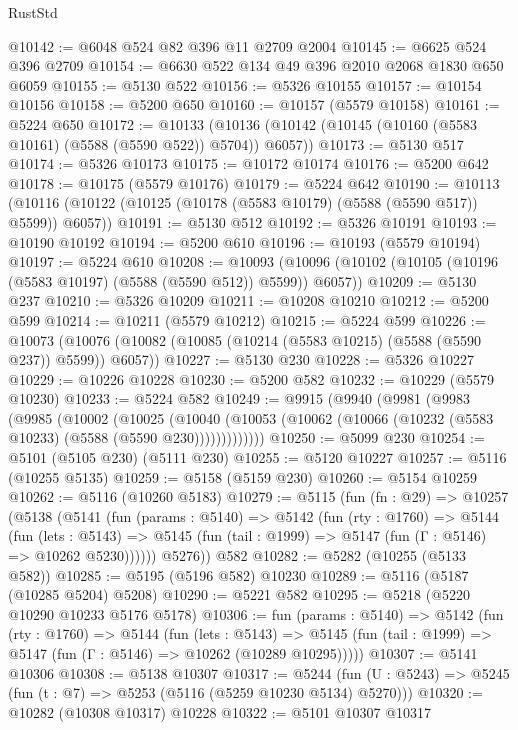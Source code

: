 \begin{lexlean}{RustStd}
\begin{coremodule}
@10142 := @6048 @524 @82 @396 @11 @2709 @2004
@10145 := @6625 @524 @396 @2709
@10154 := @6630 @522 @134 @49 @396 @2010 @2068 @1830 @650 @6059
@10155 := @5130 @522
@10156 := @5326 @10155
@10157 := @10154 @10156
@10158 := @5200 @650
@10160 := @10157 (@5579 @10158)
@10161 := @5224 @650
@10172 := @10133 (@10136 (@10142 (@10145 (@10160 (@5583 @10161) (@5588 (@5590 @522)) @5704)) @6057))
@10173 := @5130 @517
@10174 := @5326 @10173
@10175 := @10172 @10174
@10176 := @5200 @642
@10178 := @10175 (@5579 @10176)
@10179 := @5224 @642
@10190 := @10113 (@10116 (@10122 (@10125 (@10178 (@5583 @10179) (@5588 (@5590 @517)) @5599)) @6057))
@10191 := @5130 @512
@10192 := @5326 @10191
@10193 := @10190 @10192
@10194 := @5200 @610
@10196 := @10193 (@5579 @10194)
@10197 := @5224 @610
@10208 := @10093 (@10096 (@10102 (@10105 (@10196 (@5583 @10197) (@5588 (@5590 @512)) @5599)) @6057))
@10209 := @5130 @237
@10210 := @5326 @10209
@10211 := @10208 @10210
@10212 := @5200 @599
@10214 := @10211 (@5579 @10212)
@10215 := @5224 @599
@10226 := @10073 (@10076 (@10082 (@10085 (@10214 (@5583 @10215) (@5588 (@5590 @237)) @5599)) @6057))
@10227 := @5130 @230
@10228 := @5326 @10227
@10229 := @10226 @10228
@10230 := @5200 @582
@10232 := @10229 (@5579 @10230)
@10233 := @5224 @582
@10249 := @9915
    (@9940
      (@9981
        (@9983
          (@9985
            (@10002
              (@10025
                (@10040
                  (@10053 (@10062 (@10066 (@10232 (@5583 @10233) (@5588 (@5590 @230)))))))))))))
@10250 := @5099 @230
@10254 := @5101 (@5105 @230) (@5111 @230)
@10255 := @5120 @10227
@10257 := @5116 (@10255 @5135)
@10259 := @5158 (@5159 @230)
@10260 := @5154 @10259
@10262 := @5116 (@10260 @5183)
@10279 := @5115
    (fun (fn : @29) =>
    @10257
      (@5138
        (@5141
          (fun (params : @5140) =>
          @5142
            (fun (rty : @1760) =>
            @5144
              (fun (lets : @5143) =>
              @5145 (fun (tail : @1999) => @5147 (fun (Γ : @5146) => @10262 @5230))))))
        @5276))
    @582
@10282 := @5282 (@10255 (@5133 @582))
@10285 := @5195 (@5196 @582) @10230
@10289 := @5116 (@5187 (@10285 @5204) @5208)
@10290 := @5221 @582
@10295 := @5218 (@5220 @10290 @10233 @5176 @5178)
@10306 := fun (params : @5140) =>
  @5142
    (fun (rty : @1760) =>
    @5144
      (fun (lets : @5143) =>
      @5145 (fun (tail : @1999) => @5147 (fun (Γ : @5146) => @10262 (@10289 @10295)))))
@10307 := @5141 @10306
@10308 := @5138 @10307
@10317 := @5244
    (fun (U : @5243) => @5245 (fun (t : @7) => @5253 (@5116 (@5259 @10230 @5134) @5270)))
@10320 := @10282 (@10308 @10317) @10228
@10322 := @5101 @10307 @10317

\end{coremodule}
\end{lexlean}
